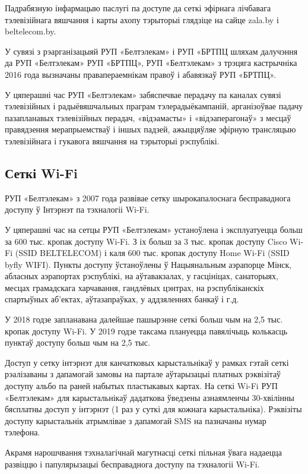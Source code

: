 Падрабязную інфармацыю паслугі па доступе да сеткі эфірнага лічбавага тэлевізійнага вяшчання і карты ахопу тэрыторыі глядзіце на сайце zala.by і beltelecom.by.

У сувязі з рэарганізацыяй РУП «Белтэлекам» і РУП «БРТПЦ шляхам далучэння да РУП «Белтэлекам» РУП «БРТПЦ», РУП «Белтэлекам» з трэцяга кастрычніка 2016 года вызначаны правапераемнікам правоў і абавязкаў РУП «БРТПЦ».

У цяперашні час РУП «Белтэлекам» забяспечвае перадачу па каналах сувязі тэлевізійных і радыёвяшчальных праграм тэлерадыёкампаній, арганізоўвае падачу пазапланавых тэлевізійных перадач, «відэамасты» і «відэаперагонаў» з месцаў правядзення мерапрыемстваў і іншых падзей, ажыццяўляе эфірную трансляцыю тэлевізійнага і гукавога вяшчання на тэрыторыі рэспублікі.

\subsection{Сеткі Wi-Fi}
РУП «Белтэлекам» з 2007 года развівае сетку шырокапалоснага бесправаднога доступу ў Інтэрнэт па тэхналогіі Wi-Fi.

У цяперашні час на сетцы РУП «Белтэлекам» устаноўлена і эксплуатуецца больш за 600 тыс. кропак доступу Wi-Fi. З іх больш за 3 тыс. кропак доступу Cisco Wi-Fi (SSID BELTELECOM) і каля 600 тыс. кропак доступу Home Wi-Fi (SSID byfly WIFI). Пункты доступу ўстаноўлены ў Нацыянальным аэрапорце Мінск, абласных аэрапортах рэспублікі, на аўтавакзалах, у гасцініцах, санаторыях, месцах грамадскага харчавання, гандлёвых цэнтрах, на рэспубліканскіх спартыўных аб'ектах, аўтазапраўках, у аддзяленнях банкаў і г.д.

У 2018 годзе запланавана далейшае пашырэнне сеткі больш чым на 2,5 тыс. кропак доступу Wi-Fi. У 2019 годзе таксама плануецца павялічыць колькасць пунктаў доступу больш чым на 2,5 тыс.

Доступ у сетку інтэрнэт для канчатковых карыстальнікаў у рамках гэтай сеткі рэалізаваны з дапамогай замовы на партале аўтарызацыі платных рэквізітаў доступу альбо па раней набытых пластыкавых картах. На сеткі Wi-Fi РУП «Белтэлекам» для карыстальнікаў дадаткова ўведзены азнаямленчы 30-хвілінны бясплатны доступ у інтэрнэт (1 раз у суткі для кожнага карыстальніка). Рэквізіты доступу карыстальнік атрымлівае з дапамогай SMS на пазначаны нумар тэлефона.

Акрамя нарошчвання тэхналагічнай магутнасці сеткі пільная ўвага надаецца развіццю і папулярызацыі бесправаднога доступу па тэхналогіі Wi-Fi.

